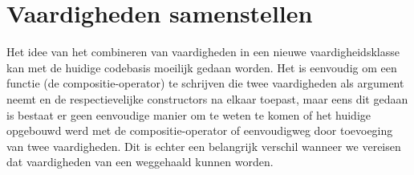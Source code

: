 \section{Vaardigheden samenstellen}
Het idee van het combineren van vaardigheden in een nieuwe vaardigheidsklasse kan met de huidige codebasis moeilijk gedaan worden. Het is eenvoudig om een functie (de compositie-operator) te schrijven die twee vaardigheden als argument neemt en de respectievelijke constructors na elkaar toepast, maar eens dit gedaan is bestaat er geen eenvoudige manier om te weten te komen of het huidige  opgebouwd werd met de compositie-operator of eenvoudigweg door toevoeging van twee vaardigheden. Dit is echter een belangrijk verschil wanneer we vereisen dat vaardigheden van een  weggehaald kunnen worden.